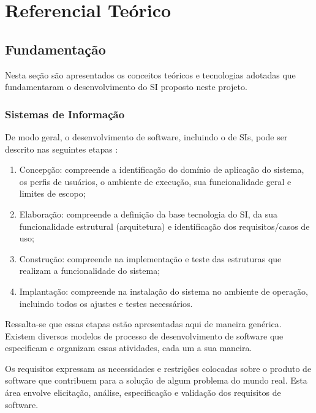 \chapter{Referencial Teórico}\label{cap:ref_teorico}

\section{Fundamentação}

Nesta seção são apresentados os conceitos teóricos e tecnologias adotadas que fundamentaram o desenvolvimento do SI proposto neste projeto. 

\subsection{Sistemas de Informação}

De modo geral, o desenvolvimento de software, incluindo o de SIs, pode ser descrito nas seguintes etapas \cite{pressman2021}:

\begin{enumerate}
    
    \item Concepção: compreende a identificação do domínio de aplicação do sistema, os perfis de usuários, o ambiente de execução, sua funcionalidade geral e limites de escopo;
   
    \item Elaboração: compreende a definição da base tecnologia do SI, da sua funcionalidade estrutural (arquitetura) e identificação dos requisitos/casos de uso;
   
    \item Construção: compreende na implementação e teste das estruturas que realizam a funcionalidade do sistema;
    
    \item Implantação: compreende na instalação do sistema no ambiente de operação, incluindo todos os ajustes e testes necessários.
    
\end{enumerate}

Ressalta-se que essas etapas estão apresentadas aqui de maneira genérica. Existem diversos modelos de processo de desenvolvimento de software que especificam e organizam essas atividades, cada um a sua maneira\cite{pressman2021}.


Os requisitos expressam as necessidades e restrições colocadas sobre o produto
de software que contribuem para a solução de algum problema do mundo real. Esta área
envolve elicitação, análise, especificação e validação dos requisitos de software\cite{SWEBOK}.

